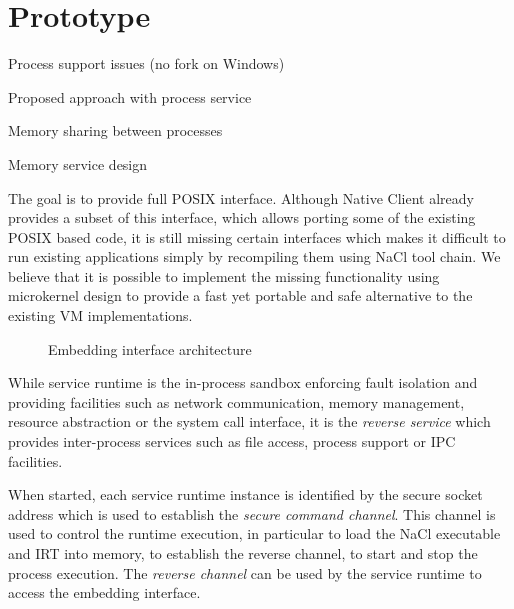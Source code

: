 \section{Prototype}
\label{sec:prototype}

\begin{structure}
\item Process support issues (\eg no fork on Windows)
\item Proposed approach with process service
\item Memory sharing between processes
\item Memory service design
\end{structure}

The goal is to provide full POSIX interface. Although Native Client
already provides a subset of this interface, which allows porting some
of the existing POSIX based code, it is still missing certain interfaces
which makes it difficult to run existing applications simply by
recompiling them using NaCl tool chain.  We believe that it is possible
to implement the missing functionality using microkernel design to
provide a fast yet portable and safe alternative to the existing VM
implementations.



\begin{figure}
\centering
\caption{Embedding interface architecture}
\label{fig:architecture}
\end{figure}

While service runtime is the in-process sandbox enforcing fault
isolation and providing facilities such as network communication, memory
management, resource abstraction or the system call interface, it is the
\emph{reverse service} which provides inter-process services such as
file access, process support or IPC facilities.

When started, each service runtime instance is identified by the
secure socket address which is used to establish the \emph{secure
command channel}. This channel is used to control the runtime execution,
in particular to load the NaCl executable and IRT into memory, to
establish the reverse channel, to start and stop the process execution.
The \emph{reverse channel} can be used by the service runtime to access
the embedding interface.

